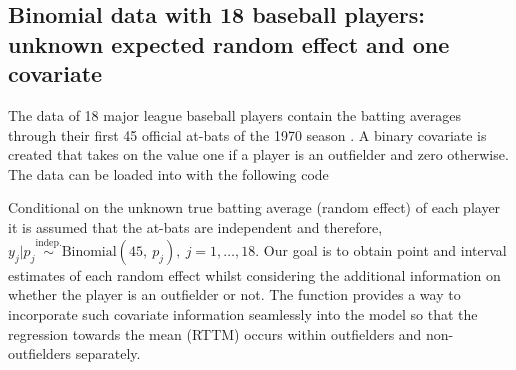 \documentclass[article]{jss}
\begin{document}
\subsection[Unknown Second-level Mean and One Covariate]{Binomial data with 18 baseball players:  unknown expected random effect and one covariate} 

The data of 18 major league baseball players contain the batting averages
through their first 45 official at-bats of the 1970 season \citep{1975}. A
binary covariate is created that takes on the value one if a player is an
outfielder and zero otherwise. The data can be loaded into  with the following code
\begin{CodeChunk}
\end{CodeChunk}
Conditional on the unknown true batting average (random effect) of each player
it is assumed that the at-bats are independent and therefore, $y_{j}\vert p_{j} \textrm{Binomial}(45,~ p_{j}), ~j=1, \ldots, 18$. Our goal is to obtain point and interval estimates of each random effect whilst considering the additional information on whether the player is an outfielder or not. The function  provides a way to incorporate such covariate information seamlessly into the model so that the regression towards the mean (RTTM) occurs within outfielders and non-outfielders separately. %
\end{document}
